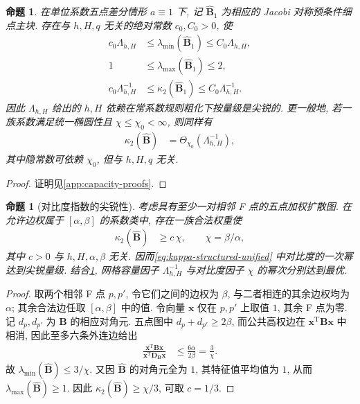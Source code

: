 \documentclass{ctexart}
\newcommand{\T}{\mathrm{T}}
\renewcommand{\ge}{\geqslant}
\renewcommand{\le}{\leqslant}
\newtheorem{proposition}[theorem]{命题}
\begin{document}
\begin{proposition}
\label{prop:structured-kappa-sharpness}
在单位系数五点差分情形 $a\equiv1$ 下,
记 $\widehat{\bm B}_1$ 为相应的 Jacobi 对称预条件细点主块.
存在与 $h,H,q$ 无关的绝对常数
$c_0,C_0>0$, 使
\begin{align}
    c_0\Lambda_{h,H}
    &\le
    \lambda_{\min}(\widehat{\bm B}_1)
    \le
    C_0\Lambda_{h,H},
    \label{eq:capacity-scale-sharp-lambda}\\
    1
    &\le
    \lambda_{\max}(\widehat{\bm B}_1)
    \le2,
    \label{eq:capacity-scale-sharp-lambda-max}\\
    c_0\Lambda_{h,H}^{-1}
    &\le
    \kappa_2(\widehat{\bm B}_1)
    \le
    C_0\Lambda_{h,H}^{-1}.
    \label{eq:capacity-scale-sharp-kappa}
\end{align}
因此 $\Lambda_{h,H}$ 给出的 $h,H$ 依赖在常系数规则粗化下按量级是尖锐的.
更一般地, 若一族系数满足统一椭圆性且
$\chi\le\chi_0<\infty$, 则同样有
\begin{align}
    \kappa_2(\widehat{\bm B})
    &=\Theta_{\chi_0}\left(\Lambda_{h,H}^{-1}\right),
    \label{eq:capacity-scale-fixed-contrast-sharp}
\end{align}
其中隐常数可依赖 $\chi_0$, 但与 $h,H,q$ 无关.
\end{proposition}

\begin{proof}
证明见\cref{app:capacity-proofs}.
\end{proof}

\begin{proposition}[对比度指数的尖锐性]
\label{prop:contrast-exponent-sharpness}
考虑具有至少一对相邻 F 点的五点加权扩散图. 在允许边权属于
$[\alpha,\beta]$ 的系数类中, 存在一族合法权重使
\begin{align}
  \kappa_2(\widehat{\bm B})&\ge c\,\chi,
  \qquad \chi=\beta/\alpha,
  \label{eq:contrast-lower-sharp}
\end{align}
其中 $c>0$ 与 $h,H,\alpha,\beta$ 无关. 因而\cref{eq:kappa-structured-unified} 中对比度的一次幂达到尖锐量级. 结合\cref{prop:structured-kappa-sharpness}, 网格容量因子
$\Lambda_{h,H}^{-1}$ 与对比度因子 $\chi$ 的幂次分别达到最优.
\end{proposition}

\begin{proof}
取两个相邻 F 点 $p,p'$, 令它们之间的边权为 $\beta$, 与二者相连的其余边权均为 $\alpha$; 其余合法边任取 $[\alpha,\beta]$ 中的值. 令向量 $\bm x$ 仅在 $p,p'$ 上取值 $1$, 其余 F 点为零. 记 $d_p,d_{p'}$ 为 $\bm B$ 的相应对角元. 五点图中
$d_p+d_{p'}\ge2\beta$, 而公共高权边在
$\bm x^\T\bm B\bm x$ 中相消, 因此至多六条外连边给出
\begin{align}
 \frac{\bm x^\T\bm B\bm x}
      {\bm x^\T\bm D_{\bm B}\bm x}
 &\le\frac{6\alpha}{2\beta}=\frac3\chi.
 \label{eq:contrast-test-rayleigh}
\end{align}
故 $\lambda_{\min}(\widehat{\bm B})\le3/\chi$. 又因
$\widehat{\bm B}$ 的对角元全为 $1$, 其特征值平均值为 $1$, 从而
$\lambda_{\max}(\widehat{\bm B})\ge1$. 因此
$\kappa_2(\widehat{\bm B})\ge\chi/3$, 可取 $c=1/3$.
\end{proof}
\end{document}
